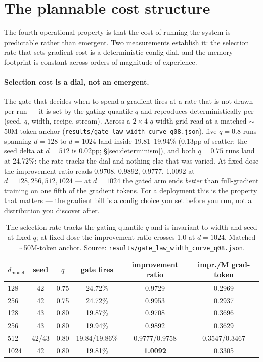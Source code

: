 \documentclass[11pt]{article}
\theoremstyle{definition}
\newcommand{\code}[1]{\texttt{#1}}
\begin{document}
\section{The plannable cost structure}
\label{sec:cost}

The fourth operational property is that the cost of running the system is
predictable rather than emergent. Two measurements establish it: the selection
rate that sets gradient cost is a deterministic config dial, and the
memory footprint is constant across orders of magnitude of experience.

\paragraph{Selection cost is a dial, not an emergent.}
The gate that decides when to spend a gradient fires at a rate that is not
drawn per run --- it is set by the gating quantile $q$ and reproduces
deterministically per (seed, $q$, width, recipe, stream). Across a
$2\times4$ $q$-width grid read at a matched $\sim$50M-token anchor
(\code{results/gate\_law\_width\_curve\_q08.json}), five $q{=}0.8$ runs
spanning $d{=}128$ to $d{=}1024$ land inside \num{19.81}--\num{19.94}\%
(0.13pp of scatter; the seed delta at $d{=}512$ is 0.02pp;
\S\ref{sec:determinism}), and both $q{=}0.75$ runs land at \num{24.72}\%:
the rate tracks the dial and nothing else that was varied. At fixed dose
the improvement ratio reads \num{0.9708}, \num{0.9892}, \num{0.9777},
\num{1.0092} at $d{=}128,256,512,1024$ --- at $d{=}1024$ the gated arm ends
\emph{better} than full-gradient training on one fifth of the gradient
tokens. For a deployment this is the property that matters --- the gradient
bill is a config choice you set before you run, not a distribution you
discover after.

\begin{table}[tb]
\centering
\caption{The selection rate tracks the gating quantile $q$ and is invariant
to width and seed at fixed $q$; at fixed dose the improvement ratio crosses
1.0 at $d{=}1024$. Matched $\sim$50M-token anchor. Source:
\code{results/gate\_law\_width\_curve\_q08.json}.}
\label{tab:cost}
\begin{tabular}{@{}lccccc@{}}
\toprule
$d_\text{model}$ & seed & $q$ & gate fires & improvement ratio & impr./M grad-token\\
\midrule
128 & 42 & 0.75 & \num{24.72}\% & \num{0.9729} & \num{0.2969}\\
256 & 42 & 0.75 & \num{24.72}\% & \num{0.9953} & \num{0.2937}\\
128 & 43 & 0.80 & \num{19.87}\% & \num{0.9708} & \num{0.3696}\\
256 & 43 & 0.80 & \num{19.94}\% & \num{0.9892} & \num{0.3629}\\
512 & 42/43 & 0.80 & \num{19.84}/\num{19.86}\% & \num{0.9777}/\num{0.9758} & \num{0.3547}/\num{0.3467}\\
1024 & 42 & 0.80 & \num{19.81}\% & \textbf{\num{1.0092}} & \num{0.3305}\\
\bottomrule
\end{tabular}
\end{table}
\end{document}
